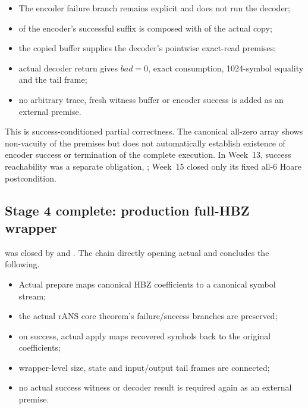 \begin{itemize}
  \item The encoder failure branch remains explicit and does not run the decoder;
  \item {} of the encoder's successful suffix is
        composed with  of the actual copy;
  \item the copied buffer supplies the decoder's pointwise exact-read premises;
  \item actual decoder return gives \(bad=0\), exact consumption, 1024-symbol
        equality and the tail frame;
  \item no arbitrary trace, fresh witness buffer or encoder success is added
        as an external premise.
\end{itemize}

This is success-conditioned partial correctness. The canonical all-zero array
shows non-vacuity of the premises but does not automatically establish existence
of encoder success or termination of the complete execution. In Week~13,
success reachability was a separate obligation,
; Week~15 closed only its fixed all-6
Hoare postcondition.

\subsection{Stage 4 complete: production full-HBZ wrapper}

 was closed by
 and
. The chain directly
opening actual  and
 concludes the following.

\begin{itemize}
  \item Actual prepare maps canonical HBZ coefficients to a canonical symbol stream;
  \item the actual rANS core theorem's failure/success branches are preserved;
  \item on success, actual apply maps recovered symbols back to the original
        coefficients;
  \item wrapper-level size, state and input/output tail frames are connected;
  \item no actual success witness or decoder result is required again as an
        external premise.
\end{itemize}

